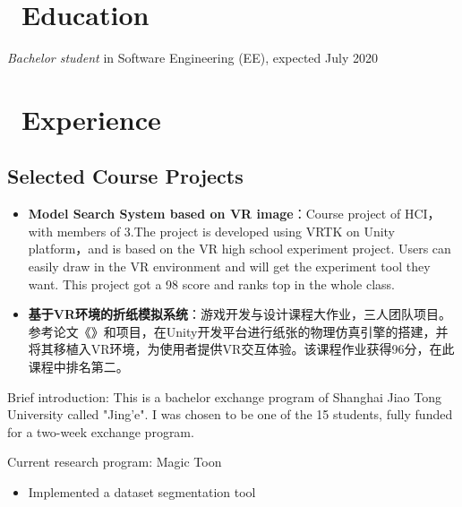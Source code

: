 \documentclass{resume}
\begin{document}




  
\section{\faGraduationCap\ Education}
\textit{Bachelor student} in Software Engineering (EE), expected July 2020

\section{\faUsers\ Experience}

\subsection{\textbf{Selected Course Projects}}
\begin{itemize}
   \item \textbf{Model Search System based on VR image}：Course project of HCI，with members of 3.The project is developed using VRTK on Unity platform，and is based on the VR high school experiment project. Users can easily draw in the VR environment and will get the experiment tool they want. This project got a 98 score and ranks top in the whole class.
  \item \textbf{基于VR环境的折纸模拟系统}：游戏开发与设计课程大作业，三人团队项目。参考论文《》和项目，在Unity开发平台进行纸张的物理仿真引擎的搭建，并将其移植入VR环境，为使用者提供VR交互体验。该课程作业获得96分，在此课程中排名第二。

\end{itemize}

Brief introduction: This is a bachelor exchange program of Shanghai Jiao Tong University called "Jing'e". I was chosen to be one of the 15 students, fully funded for a two-week exchange program.



Current research program: Magic Toon
\begin{itemize}
  \item Implemented a dataset segmentation tool
\end{itemize}
\end{document}
